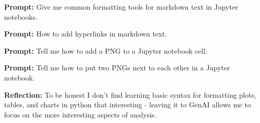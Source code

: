 \documentclass[11pt]{article}
\begin{document}
\textbf{Prompt:} Give me common formatting tools for markdown text in
Jupyter notebooks.

\textbf{Prompt:} How to add hyperlinks in markdown text.

\textbf{Prompt:} Tell me how to add a PNG to a Jupyter notebook cell.

\textbf{Prompt:} Tell me how to put two PNGs next to each other in a
Jupyter notebook.

\textbf{Reflection:} To be honest I don't find learning basic syntax for
formatting plots, tables, and charts in python that interesting -
leaving it to GenAI allows me to focus on the more interesting aspects
of analysis.


    
    
    
\end{document}
